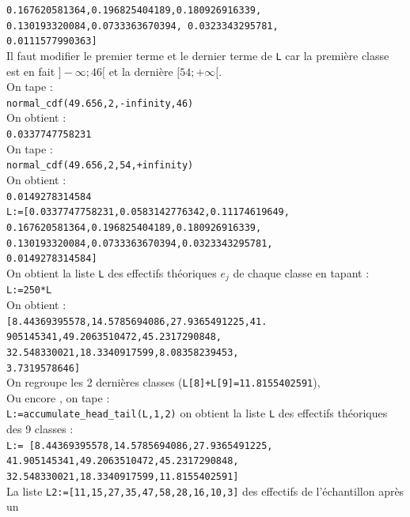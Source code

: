 \documentclass[a4paper,11pt]{book}
\begin{document}
{\tt 0.167620581364,0.196825404189,0.180926916339,}\\
{\tt 0.130193320084,0.0733363670394, 0.0323343295781,}\\
{\tt 0.0111577990363] }\\
Il faut modifier le premier terme et le dernier terme de {\tt L} car la 
premi\`ere classe est en fait $]-\infty;46[$ et la derni\`ere $[54;+\infty[$.\\
On tape :\\
{\tt normal\_cdf(49.656,2,-infinity,46)}\\
On obtient :\\
{\tt 0.0337747758231}\\
On tape :\\
{\tt normal\_cdf(49.656,2,54,+infinity)}\\
On obtient :\\
{\tt 0.0149278314584} \\
{\tt L:=[0.0337747758231,0.0583142776342,0.11174619649,}\\
{\tt 0.167620581364,0.196825404189,0.180926916339,}\\
{\tt 0.130193320084,0.0733363670394,0.0323343295781,}\\
{\tt 0.0149278314584] }\\
On obtient la liste {\tt L} des effectifs th\'eoriques $e_j$ de chaque classe
 en tapant :\\
{\tt L:=250*L}\\
On obtient :\\
{\tt [8.44369395578,14.5785694086,27.9365491225,41.}\\
{\tt 905145341,49.2063510472,45.2317290848,}\\
{\tt 32.548330021,18.3340917599,8.08358239453,}\\
{\tt 3.7319578646]}\\
On regroupe les 2 derni\`eres classes ({\tt L[8]+L[9]=11.8155402591}), \\
Ou encore , on tape :\\
{\tt L:=accumulate\_head\_tail(L,1,2)}
on obtient la liste  {\tt L} des effectifs th\'eoriques des 9 classes :\\
{\tt L:= [8.44369395578,14.5785694086,27.9365491225,}\\
{\tt 41.905145341,49.2063510472,45.2317290848,}\\
{\tt 32.548330021,18.3340917599,11.8155402591]}\\
La liste  {\tt L2:=[11,15,27,35,47,58,28,16,10,3]} des effectifs de 
 l'\'echantillon  apr\`es un  
\end{document}
